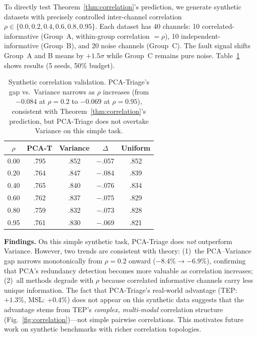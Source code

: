 \documentclass[journal]{IEEEtran}
\begin{document}
To directly test Theorem~\ref{thm:correlation}'s prediction, we generate synthetic datasets with precisely controlled inter-channel correlation $\rho \in \{0.0, 0.2, 0.4, 0.6, 0.8, 0.95\}$. Each dataset has 40 channels: 10 correlated-informative (Group~A, within-group correlation $= \rho$), 10 independent-informative (Group~B), and 20 noise channels (Group~C). The fault signal shifts Group~A and B means by $+1.5\sigma$ while Group~C remains pure noise. Table~\ref{tab:synth_corr} shows results (5 seeds, 50\% budget).

\begin{table}[t]
\centering
\caption{Synthetic correlation validation. PCA-Triage's gap vs.\ Variance narrows as $\rho$ increases (from $-0.084$ at $\rho{=}0.2$ to $-0.069$ at $\rho{=}0.95$), consistent with Theorem~\ref{thm:correlation}'s prediction, but PCA-Triage does not overtake Variance on this simple task.}
\begin{tabular}{@{}ccccc@{}}
\toprule
$\rho$ & \textbf{PCA-T} & \textbf{Variance} & \textbf{$\Delta$} & \textbf{Uniform} \\
\midrule
0.00 & .795 & .852 & $-$.057 & .852 \\
0.20 & .764 & .847 & $-$.084 & .839 \\
0.40 & .765 & .840 & $-$.076 & .834 \\
0.60 & .762 & .837 & $-$.075 & .829 \\
0.80 & .759 & .832 & $-$.073 & .828 \\
0.95 & .761 & .830 & $-$.069 & .821 \\
\bottomrule
\end{tabular}
\label{tab:synth_corr}
\end{table}

\textbf{Findings.} On this simple synthetic task, PCA-Triage does \textit{not} outperform Variance. However, two trends are consistent with theory: (1)~the PCA--Variance gap narrows monotonically from $\rho = 0.2$ onward ($-8.4\% \to -6.9\%$), confirming that PCA's redundancy detection becomes more valuable as correlation increases; (2)~all methods degrade with $\rho$ because correlated informative channels carry less unique information. The fact that PCA-Triage's real-world advantage (TEP: $+1.3\%$, MSL: $+0.4\%$) does not appear on this synthetic data suggests that the advantage stems from TEP's \textit{complex, multi-modal} correlation structure (Fig.~\ref{fig:correlation})---not simple pairwise correlations. This motivates future work on synthetic benchmarks with richer correlation topologies.
\end{document}
